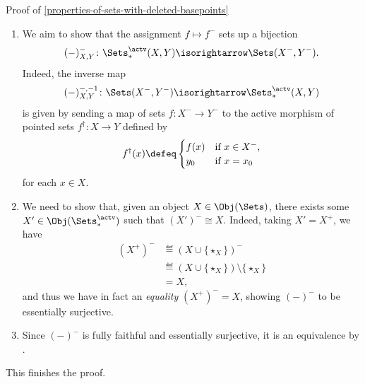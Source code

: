 \begin{Proof}{Proof of \cref{properties-of-sets-with-deleted-basepoints}}
\begin{enumerate}
        \item\label{proof-of-properties-of-sets-with-deleted-basepoints-adjoint-equivalence-8}We aim to show that the assignment $f\mapsto f^{-}$ sets up a bijection
            \[
                (-)^{-}_{X,Y}%
                \colon%
                \Sets^{\actv}_{*}(X,Y)%
                \isorightarrow%
                \Sets(X^{-},Y^{-}).%
            \]%
            Indeed, the inverse map
            \[
                (-)^{-,-1}_{X,Y}%
                \colon%
                \Sets(X^{-},Y^{-})%
                \isorightarrow%
                \Sets^{\actv}_{*}(X,Y)%
            \]%
            is given by sending a map of sets $f\colon X^{-}\to Y^{-}$ to the active morphism of pointed sets $f^{\dagger}\colon X\to Y$ defined by
            \[
                f^{\dagger}(x)%
                \defeq%
                \begin{cases}
                    f(x)  &\text{if $x\in X^{-}$,}\\
                    y_{0} &\text{if $x=x_{0}$}
                \end{cases}
            \]%
            for each $x\in X$.
        \item\label{proof-of-properties-of-sets-with-deleted-basepoints-adjoint-equivalence-9}We need to show that, given an object $X\in\Obj(\Sets)$, there exists some $X'\in\Obj(\Sets^{\actv}_{*})$ such that $(X')^{-}\cong X$. Indeed, taking $X'=X^{+}$, we have
            \begin{align*}
                (X^{+})^{-} &\eqdef (X\cup\{\star_{X}\})^{-}\\
                            &\eqdef (X\cup\{\star_{X}\})\setminus\{\star_{X}\}\\
                            &=      X,
            \end{align*}
            and thus we have in fact an \emph{equality} $(X^{+})^{-}=X$, showing $(-)^{-}$ to be essentially surjective.
        \item\label{proof-of-properties-of-sets-with-deleted-basepoints-adjoint-equivalence-10}Since $(-)^{-}$ is fully faithful and essentially surjective, it is an equivalence by .
    \end{enumerate}
    This finishes the proof.


\end{Proof}
